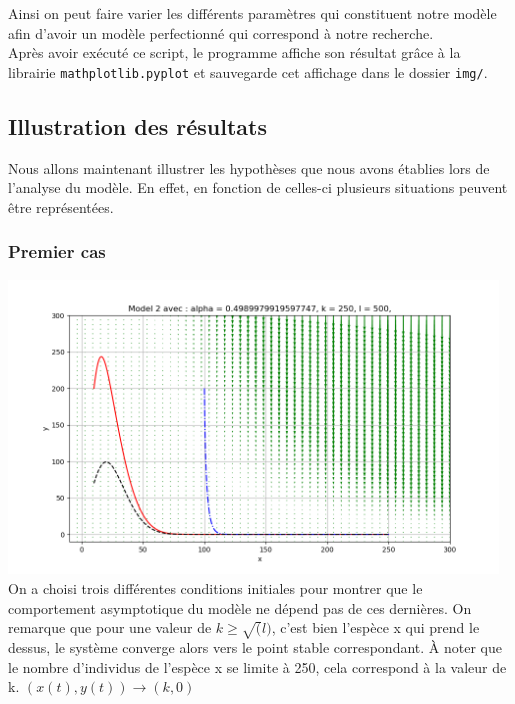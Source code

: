 \documentclass{article}
\begin{document}
\vspace{0.5cm}
Ainsi on peut faire varier les différents paramètres qui constituent notre modèle afin d'avoir un modèle perfectionné qui correspond à notre recherche.\\
Après avoir exécuté ce script, le programme affiche son résultat grâce à la librairie \verb|mathplotlib.pyplot| et sauvegarde cet affichage dans le dossier \verb|img/|.

\newpage
\subsection{Illustration des résultats}
Nous allons maintenant illustrer les hypothèses que nous avons établies lors de l'analyse du modèle. En effet, en fonction de celles-ci plusieurs situations  peuvent être représentées.

\subsubsection{Premier cas}
\includegraphics[width = 13cm]{../img/x_predom2.png}\\
On a choisi trois différentes conditions initiales pour montrer que le comportement asymptotique du modèle ne dépend pas de ces dernières. On remarque que pour une valeur de $k\geqslant \sqrt(l)$, c'est bien l'espèce x qui prend le dessus, le système converge alors vers le point stable correspondant. À noter que le nombre d'individus de l'espèce x se limite à 250, cela correspond à la valeur de k. $(x(t),y(t)) \longrightarrow (k,0) $
\end{document}
